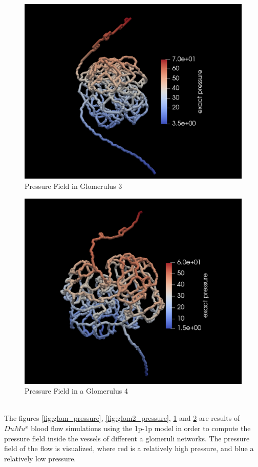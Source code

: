 \begin{figure}[h]
\centering
\includegraphics[width=162mm]{glom3_pressure}
\caption{Pressure Field in Glomerulus 3}
\label{fig:glom3_pressure}
\end{figure}
\begin{figure}[h]
\centering
\includegraphics[width=162mm]{glom4_pressure}
\caption{Pressure Field in a Glomerulus 4}
\label{fig:glom4_pressure}
\end{figure}\\
The figures \ref{fig:glom_pressure},  \ref{fig:glom2_pressure},  \ref{fig:glom3_pressure} and  \ref{fig:glom4_pressure} are results of $DuMu^x$ blood flow simulations using the 1p-1p model in order to compute the pressure field inside the vessels of different a glomeruli networks. The pressure field of the flow is visualized, where red is a relatively high pressure, and blue a relatively low pressure.\\

